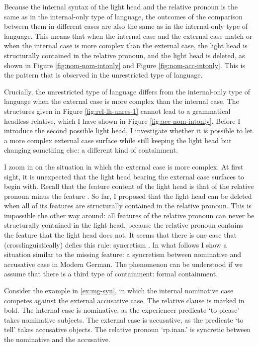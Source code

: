 Because the internal syntax of the light head and the relative pronoun is the same as in the internal-only type of language, the outcomes of the comparison between them in different cases are also the same as in the internal-only type of language. This means that when the internal case and the external case match or when the internal case is more complex than the external case, the light head is structurally contained in the relative pronoun, and the light head is deleted, as shown in Figure \ref{fig:nom-nom-intonly} and Figure \ref{fig:nom-acc-intonly}. This is the pattern that is observed in the unrestricted type of language.

Crucially, the unrestricted type of language differs from the internal-only type of language when the external case is more complex than the internal case. The structures given in Figure \ref{fig:rel-lh-unres-1} cannot lead to a grammatical headless relative, which I have shown in Figure \ref{fig:acc-nom-intonly}. Before I introduce the second possible light head, I investigate whether it is possible to let a more complex external case surface while still keeping the light head but changing something else: a different kind of containment.

I zoom in on the situation in which the external case is more complex.
At first sight, it is unexpected that the light head bearing the external case surfaces to begin with. Recall that the feature content of the light head is that of the relative pronoun minus the feature .
So far, I proposed that the light head can be deleted when all of its features are structurally contained in the relative pronoun. This is impossible the other way around: all features of the relative pronoun can never be structurally contained in the light head, because the relative pronoun contains the feature  that the light head does not. It seems that there is one case that (crosslinguistically) defies this rule: syncretism \citep[cf.]{groos1981,dyta1984,zaenen1984,pullum1986,ingria1990,dalrymple2000,sag2003}.
In what follows I show a situation similar to the missing  feature: a syncretism between nominative and accusative case in Modern German.
The phenomenon can be understood if we assume that there is a third type of containment: formal containment.

Consider the example in \ref{ex:mg-syn}, in which the internal nominative case competes against the external accusative case. The relative clause is marked in bold.
The internal case is nominative, as the experiencer predicate  `to please' takes nominative subjects.
The external case is accusative, as the predicate  `to tell' takes accusative objects.
The relative pronoun  `\ac{rp}.\ac{inan}.' is syncretic between the nominative and the accusative.

